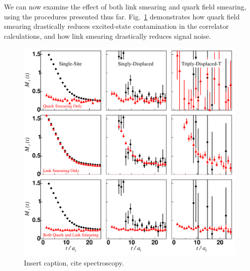     We can now examine the effect of both link smearing and quark field smearing, using the procedures presented thus far. Fig.~\ref{fig:meff-smearing} demonstrates how quark field smearing drastically reduces excited-state contamination in the correlator calculations, and how link smearing drastically reduces signal noise.
    \begin{figure}
        \centering
        \includegraphics[scale=0.8]{figures/meff-smearing.pdf}
        \caption{Insert caption, cite spectroscopy.}\label{fig:meff-smearing}
    \end{figure}
    
